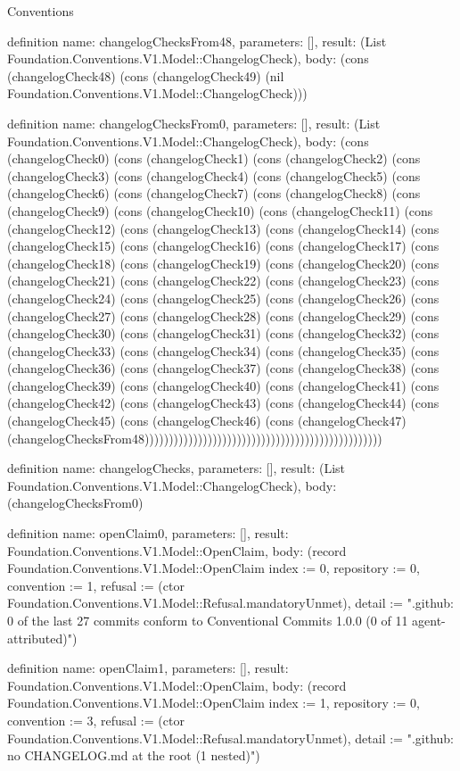 \begin{lexlean}{Conventions}
\begin{semanticmodule}
definition{
  name: changelogChecksFrom48,
  parameters: [],
  result: (List Foundation.Conventions.V1.Model::ChangelogCheck),
  body: (cons (changelogCheck48) (cons (changelogCheck49) (nil Foundation.Conventions.V1.Model::ChangelogCheck)))
}

definition{
  name: changelogChecksFrom0,
  parameters: [],
  result: (List Foundation.Conventions.V1.Model::ChangelogCheck),
  body: (cons (changelogCheck0) (cons (changelogCheck1) (cons (changelogCheck2) (cons (changelogCheck3) (cons (changelogCheck4) (cons (changelogCheck5) (cons (changelogCheck6) (cons (changelogCheck7) (cons (changelogCheck8) (cons (changelogCheck9) (cons (changelogCheck10) (cons (changelogCheck11) (cons (changelogCheck12) (cons (changelogCheck13) (cons (changelogCheck14) (cons (changelogCheck15) (cons (changelogCheck16) (cons (changelogCheck17) (cons (changelogCheck18) (cons (changelogCheck19) (cons (changelogCheck20) (cons (changelogCheck21) (cons (changelogCheck22) (cons (changelogCheck23) (cons (changelogCheck24) (cons (changelogCheck25) (cons (changelogCheck26) (cons (changelogCheck27) (cons (changelogCheck28) (cons (changelogCheck29) (cons (changelogCheck30) (cons (changelogCheck31) (cons (changelogCheck32) (cons (changelogCheck33) (cons (changelogCheck34) (cons (changelogCheck35) (cons (changelogCheck36) (cons (changelogCheck37) (cons (changelogCheck38) (cons (changelogCheck39) (cons (changelogCheck40) (cons (changelogCheck41) (cons (changelogCheck42) (cons (changelogCheck43) (cons (changelogCheck44) (cons (changelogCheck45) (cons (changelogCheck46) (cons (changelogCheck47) (changelogChecksFrom48)))))))))))))))))))))))))))))))))))))))))))))))))
}

definition{
  name: changelogChecks,
  parameters: [],
  result: (List Foundation.Conventions.V1.Model::ChangelogCheck),
  body: (changelogChecksFrom0)
}

definition{
  name: openClaim0,
  parameters: [],
  result: Foundation.Conventions.V1.Model::OpenClaim,
  body: (record Foundation.Conventions.V1.Model::OpenClaim {index := 0, repository := 0, convention := 1, refusal := (ctor Foundation.Conventions.V1.Model::Refusal.mandatoryUnmet), detail := ".github: 0 of the last 27 commits conform to Conventional Commits 1.0.0 (0 of 11 agent-attributed)"})
}

definition{
  name: openClaim1,
  parameters: [],
  result: Foundation.Conventions.V1.Model::OpenClaim,
  body: (record Foundation.Conventions.V1.Model::OpenClaim {index := 1, repository := 0, convention := 3, refusal := (ctor Foundation.Conventions.V1.Model::Refusal.mandatoryUnmet), detail := ".github: no CHANGELOG.md at the root (1 nested)"})
}


\end{semanticmodule}
\end{lexlean}
